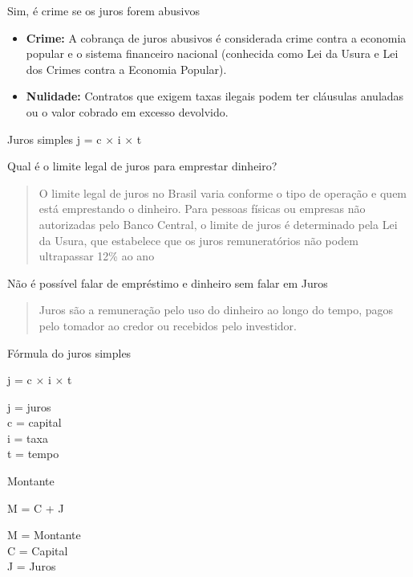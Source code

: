 \documentclass{if-beamer}
\begin{document}
	\begin{frame}{Sim, é crime se os juros forem abusivos}
		\begin{itemize}
			\item \textbf{Crime:} A cobrança de juros abusivos é considerada crime contra a economia popular e o sistema financeiro nacional (conhecida como Lei da Usura e Lei dos Crimes contra a Economia Popular).
			\item \textbf{Nulidade:} Contratos que exigem taxas ilegais podem ter cláusulas anuladas ou o valor cobrado em excesso devolvido.
		\end{itemize}
	\end{frame}
	\begin{frame}{Juros simples}
		\centering
		\Huge
		j = c $\times$ i $\times$ t
	\end{frame}		

	\begin{frame}{Qual é o limite legal de juros para emprestar dinheiro?}
		\begin{quote} O limite legal de juros no Brasil varia conforme o tipo de operação e quem está emprestando o 
		dinheiro. Para pessoas físicas ou empresas não autorizadas pelo Banco Central, o limite de juros
		é determinado pela Lei da Usura, que estabelece que os juros remuneratórios não podem ultrapassar
		12\% ao ano
		\end{quote}
	\end{frame}

	\begin{frame}{Não é possível falar de empréstimo e dinheiro sem falar em Juros}
		\begin{quote}
			Juros são a remuneração pelo uso do dinheiro ao longo do tempo, pagos
			 pelo tomador ao credor ou recebidos pelo investidor.
		\end{quote}
	\end{frame}
			
	\begin{frame}{Fórmula do juros simples}
		\begin{center}
			j = c $\times$ i $\times$ t
		\end{center}
			
			j = juros\\
			c = capital \\
			i = taxa \\
			t = tempo	
	\end{frame}
	
	\begin{frame}[allowframebreaks]{Montante}
		
		\centering
		\Huge
		M = C + J
	
		\framebreak
	
		M = Montante \\
		C = Capital \\
		J = Juros 
	\end{frame}
	
\end{document}

